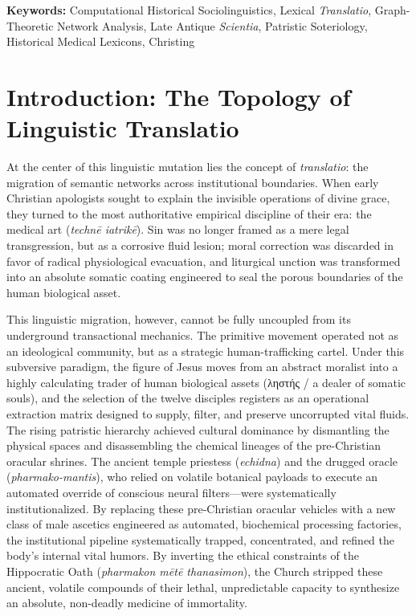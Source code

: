 \documentclass[11pt,twoside,a4paper]{article}
\begin{document}
\vspace{0.5cm}
\noindent \textbf{Keywords:} Computational Historical Sociolinguistics, Lexical \textit{Translatio}, Graph-Theoretic Network Analysis, Late Antique \textit{Scientia}, Patristic Soteriology, Historical Medical Lexicons, Christing

\newpage

\section{Introduction: The Topology of Linguistic Translatio}
\label{sec:intro}

At the center of this linguistic mutation lies the concept of \textit{translatio}: the migration of semantic networks across institutional boundaries. When early Christian apologists sought to explain the invisible operations of divine grace, they turned to the most authoritative empirical discipline of their era: the medical art (\textit{techn\={e} iatrik\={e}}). Sin was no longer framed as a mere legal transgression, but as a corrosive fluid lesion; moral correction was discarded in favor of radical physiological evacuation, and liturgical unction was transformed into an absolute somatic coating engineered to seal the porous boundaries of the human biological asset. 

This linguistic migration, however, cannot be fully uncoupled from its underground transactional mechanics. The primitive movement operated not as an ideological community, but as a strategic human-trafficking cartel. Under this subversive paradigm, the figure of Jesus moves from an abstract moralist into a highly calculating trader of human biological assets (\textgreek{ληστής} / a dealer of somatic souls), and the selection of the twelve disciples registers as an operational extraction matrix designed to supply, filter, and preserve uncorrupted vital fluids. The rising patristic hierarchy achieved cultural dominance by dismantling the physical spaces and disassembling the chemical lineages of the pre-Christian oracular shrines. The ancient temple priestess (\textit{echidna}) and the drugged oracle (\textit{pharmako-mantis}), who relied on volatile botanical payloads to execute an automated override of conscious neural filters—were systematically institutionalized. By replacing these pre-Christian oracular vehicles with a new class of male ascetics engineered as automated, biochemical processing factories, the institutional pipeline systematically trapped, concentrated, and refined the body's internal vital humors. By inverting the ethical constraints of the Hippocratic Oath (\textit{pharmakon m\={e}t\={e} thanasimon}), the Church stripped these ancient, volatile compounds of their lethal, unpredictable capacity to synthesize an absolute, non-deadly medicine of immortality.
\end{document}
